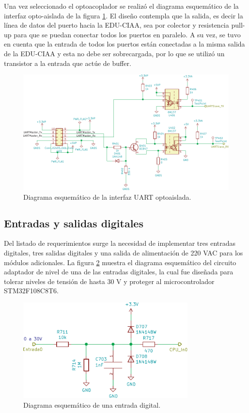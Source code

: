 Una vez seleccionado el optoacoplador se realizó el diagrama esquemático de la interfaz opto-aislada de la figura \ref{fig:InterfazOpto}. El diseño contempla que la salida, es decir la línea de datos del puerto hacia la EDU-CIAA, sea por colector y resistencia pull-up para que se puedan conectar todos los puertos en paralelo. A su vez, se tuvo en cuenta que la entrada de todos los puertos están conectadas a la misma salida de la EDU-CIAA y esta no debe ser sobrecargada, por lo que se utilizó un transistor a la entrada que actúe de buffer.

\begin{figure}[H]
	\centering
	\includegraphics[width=1\textwidth]{./Figures/InterfazOpto.pdf}
	\caption{Diagrama esquemático de la interfaz UART optoaislada.}
	\label{fig:InterfazOpto}
\end{figure}


\subsection{Entradas y salidas digitales}

Del listado de requerimientos surge la necesidad de implementar tres entradas digitales, tres salidas digitales y una salida de alimentación de 220 VAC para los módulos adicionales. La figura \ref{fig:EntradaDigital} muestra el diagrama esquemático del circuito adaptador de nivel de una de las entradas digitales, la cual fue diseñada para tolerar niveles de tensión de hasta 30 V y proteger al microcontrolador STM32F108C8T6.

\begin{figure}[H]
	\centering
	\includegraphics[width=0.8\textwidth]{./Figures/EntradaDigital.pdf}
	\caption{Diagrama esquemático de una entrada digital.}
	\label{fig:EntradaDigital}
\end{figure}

